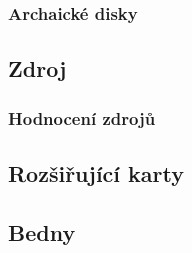 \documentclass[a4paper]{article}
\begin{document}
        \subsubsection{Archaické disky}
    \subsection{Zdroj}
        \subsubsection{Hodnocení zdrojů}
    \subsection{Rozšiřující karty}
    \subsection{Bedny}

\newpage
\end{document}

